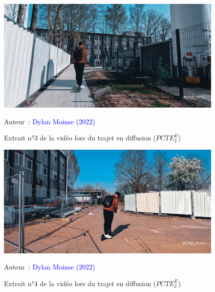     \begin{figure}[h!]\vspace*{4pt}
        \caption*{Extrait n°3 de la vidéo lors du trajet en diffusion (\(PCTE^{E}_{2}\))}
        \centerline{\includegraphics[width=0.75\columnwidth]{src/Figures/Annexes/Extrait_Video_PCTE2_Egress_3.jpg}}
        \vspace{5pt}
        \begin{flushright}\scriptsize{
        Auteur~: \textcolor{blue}{Dylan Moinse (2022)}
        }\end{flushright}
    \end{figure}

    \begin{figure}[h!]\vspace*{4pt}
        \caption*{Extrait n°4 de la vidéo lors du trajet en diffusion (\(PCTE^{E}_{2}\))}
        \centerline{\includegraphics[width=0.75\columnwidth]{src/Figures/Annexes/Extrait_Video_PCTE2_Egress_4.jpg}}
        \vspace{5pt}
        \begin{flushright}\scriptsize{
        Auteur~: \textcolor{blue}{Dylan Moinse (2022)}
        }\end{flushright}
    \end{figure}

